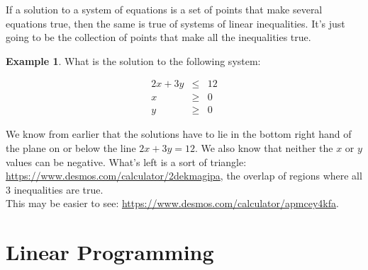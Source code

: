 \documentclass[10pt]{article}
\theoremstyle{definition}
\newtheorem{example}[equation]{Example}
\begin{document}
If a solution to a system of equations is a set of points that make several equations true, then the same is true of systems of linear inequalities.  It's just going to be the collection of points that make all the inequalities true.


\begin{example}
What is the solution to the following system:

\begin{eqnarray*}
2x+3y&\leq&12\\
x&\geq&0\\
y&\geq&0
\end{eqnarray*}

We know from earlier that the solutions have to lie in the bottom right hand of the plane on or below the line $2x+3y=12$.  We also know that neither the $x$ or $y$ values can be negative.  What's left is a sort of triangle: \url{https://www.desmos.com/calculator/2dekmagipa}, the overlap of regions where all 3 inequalities are true.\\

This may be easier to see: \url{https://www.desmos.com/calculator/apmcey4kfa}.





\end{example}

\newpage
\section{Linear Programming}
\end{document}
